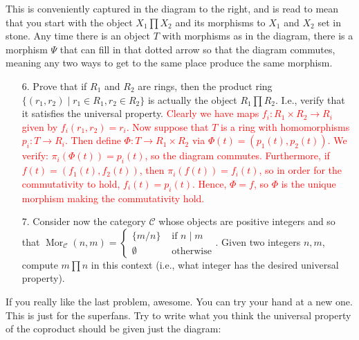 \documentclass[12pt]{article}
\newcommand{\calC}{\mathcal{C}}
\newcommand{\solution}[1]{\textcolor{red}{#1}}
\begin{document}
\begin{minipage}{0.55\linewidth}This is conveniently captured in the diagram to the right, and is read to mean that you start with the
  object $X_1 \prod X_2$ and its morphisms to $X_1$ and $X_2$ set in
  stone. Any time there is an object $T$ with morphisms as in the
  diagram, there is a morphism $\Psi$ that can fill in that dotted
  arrow so that the diagram commutes, meaning any two ways to get to
  the same place produce the same morphism. 
\end{minipage} \begin{minipage}{0.4\linewidth}
\end{minipage}
\begin{enumerate}
\item[6.] Prove that if $R_1$ and $R_2$ are rings, then the
  product ring $\{(r_1,r_2) \mid r_1\in R_1, r_2\in R_2\}$ is actually
  the object $R_1 \prod R_2$. I.e., verify that it satisfies the
  universal property. 
\solution{
Clearly we have maps $f_i: R_1 \times R_2 \rightarrow R_i$ given by
$f_i(r_1,r_2)=r_i$. Now suppose that $T$ is a ring with homomorphisms
$p_i: T\rightarrow R_i$. Then define $\Phi: T\rightarrow R_1\times
R_2$ via $\Phi(t) = (p_1(t), p_2(t))$. We verify:
$\pi_i(\Phi(t))=p_i(t)$, so the diagram commutes. Furthermore, if
$f(t)=(f_1(t),f_2(t))$, then $\pi_i(f(t))=f_i(t)$, so in order for the
commutativity to hold, $f_i(t)=p_i(t)$. Hence, $\Phi=f$, so $\Phi$ is
the unique morphism making the commutativity hold.}
\item[7.] Consider now the category $\calC$ whose objects are positive
  integers and so that $\operatorname{Mor}_\calC(n,m) =\begin{cases}
    \{m/n\} & \textrm{ if } n\mid m\\
\emptyset & \textrm{ otherwise}\end{cases}.$ Given two integers $n,m$,
compute $m \prod n$ in this context (i.e., what integer has the
desired universal property). 
\end{enumerate}
If you really like the last problem, awesome. You can try your hand at
a new one. This is just for the superfans. Try to write what you think
the universal property of the coproduct should be given just the
diagram: 
\end{document}
